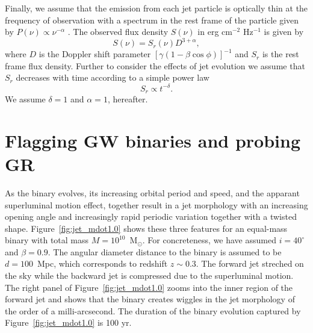 \documentclass[a4paper,fleqn,usenatbib]{mnras}
\begin{document}
Finally, we assume that the emission from each jet particle is
optically thin at the frequency of observation with a spectrum in the
rest frame of the particle given by $P(\nu)\propto \nu^{-\alpha}$
\citep{1982ApJ...262..478G}.  The observed flux density $S(\nu)$ in erg
cm$^{-2}$ Hz$^{-1}$ is given by
\begin{equation}
  S(\nu)=S_r(\nu)D^{3+\alpha},
\end{equation}
where $D$ is the Doppler shift parameter
$[\gamma(1-\beta\cos\phi)]^{-1}$ and $S_r$ is the rest frame flux
density.  Further to consider the effects of jet evolution we assume
that $S_r$ decreases with time according to a simple power law
\begin{equation}
  S_r\propto t^{-\delta}.
\end{equation}
We assume $\delta=1$ and $\alpha=1$, hereafter. 

\section{Flagging GW binaries and probing GR}

As the binary evolves, its increasing orbital period and speed, and
the apparant superluminal motion effect, together result in a jet
morphology with an increasing opening angle and increasingly rapid
periodic variation together with a twisted shape.
Figure~\ref{fig:jet_mdot1.0} shows these three features for an
equal-mass binary with total mass $M=10^{10}$~M$_\odot$.  For
concreteness, we have assumed $i=40^\circ$ and $\beta=0.9$.  The
angular diameter distance to the binary is assumed to be $d =
100$~Mpc, which corresponds to redshift $z\sim 0.3$.  The forward jet
streched on the sky while the backward jet is compressed due to the
superluminal motion.  The right panel of Figure~\ref{fig:jet_mdot1.0}
zooms into the inner region of the forward jet and shows that the
binary creates wiggles in the jet morphology of the order of a
milli-arcsecond.  The duration of the binary evolution captured by
Figure~\ref{fig:jet_mdot1.0} is 100 yr.

\end{document}
